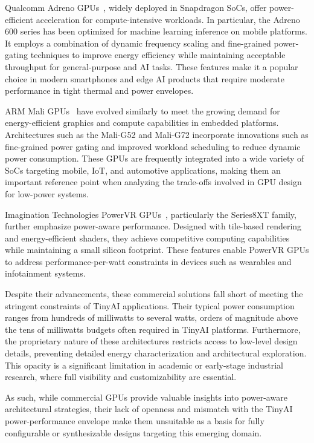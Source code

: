             Qualcomm Adreno GPUs~\cite{qualcomm}, widely deployed in Snapdragon SoCs, offer power-efficient acceleration for compute-intensive workloads. In particular, the Adreno 600 series has been optimized for machine learning inference on mobile platforms. It employs a combination of dynamic frequency scaling and fine-grained power-gating techniques to improve energy efficiency while maintaining acceptable throughput for general-purpose and AI tasks. These features make it a popular choice in modern smartphones and edge AI products that require moderate performance in tight thermal and power envelopes.
            
            ARM Mali GPUs~\cite{arm} have evolved similarly to meet the growing demand for energy-efficient graphics and compute capabilities in embedded platforms. Architectures such as the Mali-G52 and Mali-G72 incorporate innovations such as fine-grained power gating and improved workload scheduling to reduce dynamic power consumption. These GPUs are frequently integrated into a wide variety of SoCs targeting mobile, IoT, and automotive applications, making them an important reference point when analyzing the trade-offs involved in GPU design for low-power systems.
            
            Imagination Technologies PowerVR GPUs~\cite{imagtech}, particularly the Series8XT family, further emphasize power-aware performance. Designed with tile-based rendering and energy-efficient shaders, they achieve competitive computing capabilities while maintaining a small silicon footprint. These features enable PowerVR GPUs to address performance-per-watt constraints in devices such as wearables and infotainment systems.
            
            Despite their advancements, these commercial solutions fall short of meeting the stringent constraints of TinyAI applications. Their typical power consumption ranges from hundreds of milliwatts to several watts, orders of magnitude above the tens of milliwatts budgets often required in TinyAI platforms. Furthermore, the proprietary nature of these architectures restricts access to low-level design details, preventing detailed energy characterization and architectural exploration. This opacity is a significant limitation in academic or early-stage industrial research, where full visibility and customizability are essential.
            
            As such, while commercial GPUs provide valuable insights into power-aware architectural strategies, their lack of openness and mismatch with the TinyAI power-performance envelope make them unsuitable as a basis for fully configurable or synthesizable designs targeting this emerging domain.

